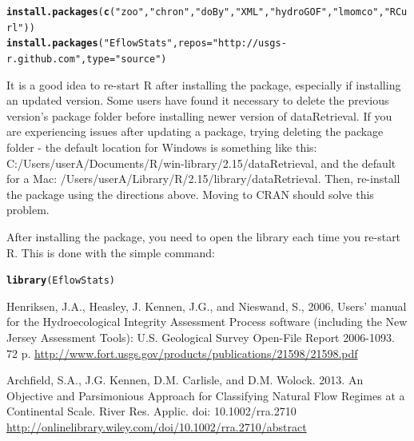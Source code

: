 \documentclass[a4paper,11pt]{article}\usepackage[]{graphicx}\usepackage[]{color}
\makeatletter
\newcommand{\hlstr}[1]{\textcolor[rgb]{0.192,0.494,0.8}{#1}}%
\newcommand{\hlstd}[1]{\textcolor[rgb]{0.345,0.345,0.345}{#1}}%
\newcommand{\hlkwc}[1]{\textcolor[rgb]{0.333,0.667,0.333}{#1}}%
\newcommand{\hlkwd}[1]{\textcolor[rgb]{0.737,0.353,0.396}{\textbf{#1}}}%
\newenvironment{kframe}{%
 \def\at@end@of@kframe{}%
 \ifinner\ifhmode%
  \def\at@end@of@kframe{\end{minipage}}%
  \begin{minipage}{\columnwidth}%
 \fi\fi%
 \def\FrameCommand##1{\hskip\@totalleftmargin \hskip-\fboxsep
 \colorbox{shadecolor}{##1}\hskip-\fboxsep
     \hskip-\linewidth \hskip-\@totalleftmargin \hskip\columnwidth}%
 \MakeFramed {\advance\hsize-\width
   \@totalleftmargin\z@ \linewidth\hsize
   \@setminipage}}%
 {\par\unskip\endMakeFramed%
 \at@end@of@kframe}
\newenvironment{knitrout}{}{} %
\makeatother
\begin{document}
\begin{knitrout}
\color{fgcolor}\begin{kframe}
\begin{alltt}
\hlkwd{install.packages}\hlstd{(}\hlkwd{c}\hlstd{(}\hlstr{"zoo"}\hlstd{,}\hlstr{"chron"}\hlstd{,}\hlstr{"doBy"}\hlstd{,}\hlstr{"XML"}\hlstd{,}\hlstr{"hydroGOF"}\hlstd{,}\hlstr{"lmomco"}\hlstd{,}\hlstr{"RCurl"}\hlstd{))}
\hlkwd{install.packages}\hlstd{(}\hlstr{"EflowStats"}\hlstd{,}\hlkwc{repos}\hlstd{=}\hlstr{"http://usgs-r.github.com"}\hlstd{,}\hlkwc{type}\hlstd{=}\hlstr{"source"}\hlstd{)}
\end{alltt}
\end{kframe}
\end{knitrout}

It is a good idea to re-start R after installing the package, especially if installing an updated version. Some users have found it necessary to delete the previous version's package folder before installing newer version of dataRetrieval. If you are experiencing issues after updating a package, trying deleting the package folder - the default location for Windows is something like this: C:/Users/userA/Documents/R/win-library/2.15/dataRetrieval, and the default for a Mac: 
/Users/userA/Library/R/2.15/library/dataRetrieval. Then, re-install the package using the directions above. Moving to CRAN should solve this problem.

After installing the package, you need to open the library each time you re-start R.  This is done with the simple command:
\begin{knitrout}
\color{fgcolor}\begin{kframe}
\begin{alltt}
\hlkwd{library}\hlstd{(EflowStats)}
\end{alltt}
\end{kframe}
\end{knitrout}

\clearpage

\begin{thebibliography}{10}

Henriksen, J.A., Heasley, J. Kennen, J.G., and Nieswand, S., 2006, Users' manual for the Hydroecological Integrity Assessment Process software (including the New Jersey Assessment Tools): U.S. Geological Survey Open-File Report 2006-1093. 72 p.
\url{http://www.fort.usgs.gov/products/publications/21598/21598.pdf}

Archfield, S.A., J.G. Kennen, D.M. Carlisle, and D.M. Wolock. 2013. An Objective and Parsimonious Approach for Classifying Natural Flow Regimes at a Continental Scale. River Res. Applic. doi: 10.1002/rra.2710
\url{http://onlinelibrary.wiley.com/doi/10.1002/rra.2710/abstract}

\end{thebibliography}
\end{document}
